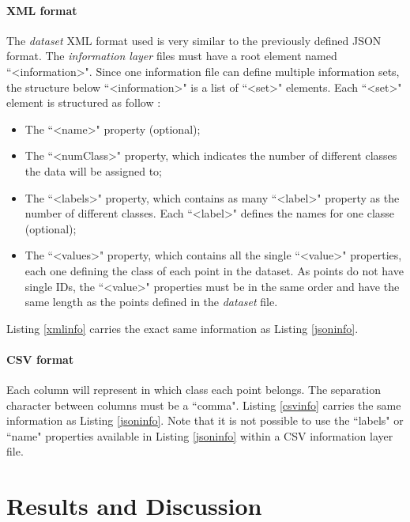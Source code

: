\documentclass[10pt]{bmc_article}
\newenvironment{bmcformat}{\baselineskip20pt\sloppy\setboolean{publ}{false}}{\baselineskip20pt\sloppy}
\begin{document}
\begin{bmcformat}
\paragraph{XML format}
The {\it{dataset}} XML format used is very similar to the previously defined JSON format. The {\it{information layer}} files must have a root element named  ``<information>". Since one information file can define multiple information sets, the structure below ``<information>" is a list of ``<set>" elements. Each ``<set>" element is structured as follow :
\begin{itemize}
\item{The ``<name>" property (optional);}
\item{The ``<numClass>" property, which indicates the number of different classes the data will be assigned to;}
\item{The ``<labels>" property, which contains as many ``<label>" property as the number of different classes. Each ``<label>" defines the names for one classe (optional);}
\item{The ``<values>" property, which contains all the single ``<value>" properties, each one defining the class of each point in the dataset. As points do not have single IDs, the ``<value>" properties must be in the same order and have the same length as the points defined in the {\it{dataset}} file.}
\end{itemize}
Listing \ref{xmlinfo} carries the exact same information as Listing \ref{jsoninfo}.


\paragraph{CSV format}
Each column will represent in which class each point belongs. The separation character between columns must be a ``comma". Listing \ref{csvinfo} carries the same information as Listing \ref{jsoninfo}. Note that it is not possible to use the ``labels" or ``name" properties available in Listing \ref{jsoninfo} within a CSV information layer file. 




\section{Results and Discussion}



\end{bmcformat}
\end{document}
